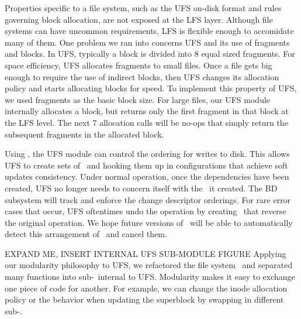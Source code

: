 Properties specific to a file system, such as the UFS on-disk format and rules
governing block allocation, are not exposed at the LFS layer.  Although file
systems can have uncommon requirements, LFS is flexible enough to accomidate
many of them. One problem we ran into concerns UFS and its use of fragments
and blocks. In UFS, typically a block is divided into 8 equal sized fragments.
For space efficiency, UFS allocates fragments to small files. Once a file gets
big enough to require the use of indirect blocks, then UFS changes its
allocation policy and starts allocating blocks for speed. To implement this
property of UFS, we used fragments as the basic block size. For large files,
our UFS module internally allocates a block, but returns only the first
fragment in that block at the LFS level. The next 7 allocation calls will be
no-ops that simply return the subsequent fragments in the allocated block.

Using \chdescs, the UFS module can control the ordering for writes to disk.
This allows UFS to create sets of \chdescs\ and hooking them up in
configurations that achieve soft updates consistency. Under normal operation,
once the dependencies have been created, UFS no longer needs to concern itself
with the \chdescs\ it created. The BD subsystem will track and enforce the
change descriptor orderings. For rare error cases that occur, UFS oftentimes
undo the operation by creating \chdescs\ that reverse the original operation.
We hope future versions of \Kudos\ will be able to automatically detect this
arrangement of \chdescs\ and cancel them.

EXPAND ME, INSERT INTERNAL UFS SUB-MODULE FIGURE
Applying our modularity philosophy to UFS, we refactored the file system
\module\ and separated many functions into sub-\modules\ internal to UFS.
Modularity makes it easy to exchange one piece of code for another. For
example, we can change the inode allocation policy or the behavior when
updating the superblock by swapping in different sub-\module.

